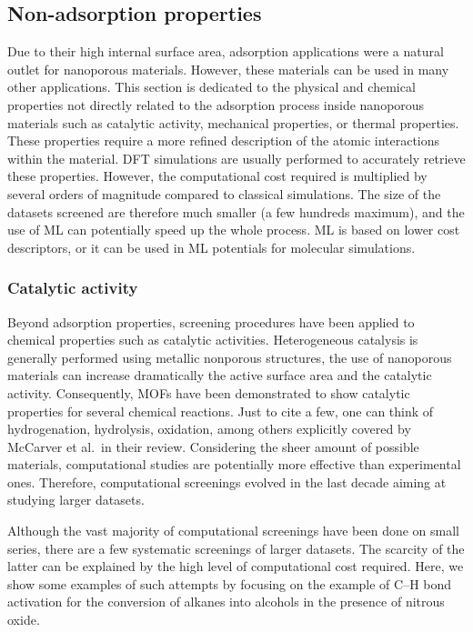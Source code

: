 \documentclass[main.tex]{subfiles}
\begin{document}
\subsection{Non-adsorption properties}

Due to their high internal surface area, adsorption applications were a natural outlet for nanoporous materials. However, these materials can be used in many other applications. This section is dedicated to the physical and chemical properties not directly related to the adsorption process inside nanoporous materials such as
catalytic activity,\cite{Singh_2015, Greeley_2006, Back_2020}
mechanical properties,\cite{Chibani_2019, Gaillac_2020}
or thermal properties.\cite{Toher_2014, Sarikurt_2020, Ducamp_2021} {These properties require a more refined description of the atomic interactions within the material. DFT simulations are usually performed to accurately retrieve these properties. However, the computational cost required is multiplied by several orders of magnitude compared to classical simulations. The size of the datasets screened are therefore much smaller (a few hundreds maximum), and the use of ML can potentially speed up the whole process. ML is based on lower cost descriptors,\cite{Evans_2017, Ducamp_2022} or it can be used in ML potentials for molecular simulations\cite{Eckhoff_2019,Friederich_2021}. }

\subsubsection{Catalytic activity}

Beyond adsorption properties, screening procedures have been applied to chemical properties such as catalytic activities.
Heterogeneous catalysis is generally performed using metallic nonporous structures, the use of nanoporous materials can increase dramatically the active surface area and the catalytic activity. Consequently, MOFs have been demonstrated to show catalytic properties for several chemical reactions. Just to cite a few, one can think of hydrogenation, hydrolysis, oxidation, among others explicitly covered by McCarver et al.\ in their review.\cite{McCarver_2021}
Considering the sheer amount of possible materials, computational studies are potentially more effective than experimental ones. Therefore, computational screenings evolved in the last decade aiming at studying larger datasets.

Although the vast majority of computational screenings have been done on small series, there are a few systematic screenings of larger datasets. The scarcity of the latter can be explained by the high level of computational cost required. Here, we show some examples of such attempts by focusing on the example of C--H bond activation for the conversion of alkanes into alcohols in the presence of nitrous oxide.
\end{document}
